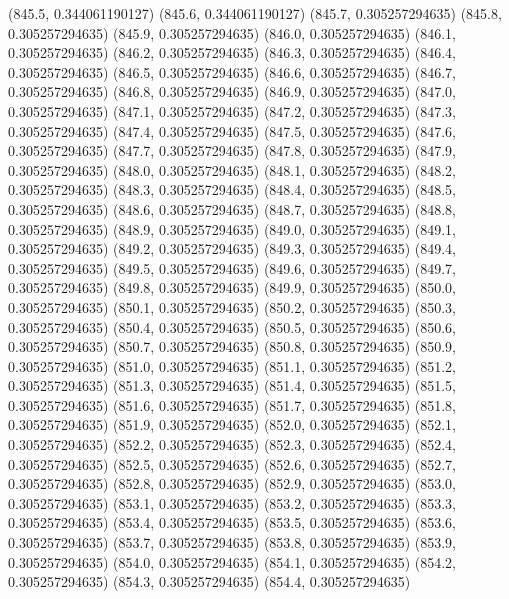 {					(845.5, 0.344061190127)
					(845.6, 0.344061190127)
					(845.7, 0.305257294635)
					(845.8, 0.305257294635)
					(845.9, 0.305257294635)
					(846.0, 0.305257294635)
					(846.1, 0.305257294635)
					(846.2, 0.305257294635)
					(846.3, 0.305257294635)
					(846.4, 0.305257294635)
					(846.5, 0.305257294635)
					(846.6, 0.305257294635)
					(846.7, 0.305257294635)
					(846.8, 0.305257294635)
					(846.9, 0.305257294635)
					(847.0, 0.305257294635)
					(847.1, 0.305257294635)
					(847.2, 0.305257294635)
					(847.3, 0.305257294635)
					(847.4, 0.305257294635)
					(847.5, 0.305257294635)
					(847.6, 0.305257294635)
					(847.7, 0.305257294635)
					(847.8, 0.305257294635)
					(847.9, 0.305257294635)
					(848.0, 0.305257294635)
					(848.1, 0.305257294635)
					(848.2, 0.305257294635)
					(848.3, 0.305257294635)
					(848.4, 0.305257294635)
					(848.5, 0.305257294635)
					(848.6, 0.305257294635)
					(848.7, 0.305257294635)
					(848.8, 0.305257294635)
					(848.9, 0.305257294635)
					(849.0, 0.305257294635)
					(849.1, 0.305257294635)
					(849.2, 0.305257294635)
					(849.3, 0.305257294635)
					(849.4, 0.305257294635)
					(849.5, 0.305257294635)
					(849.6, 0.305257294635)
					(849.7, 0.305257294635)
					(849.8, 0.305257294635)
					(849.9, 0.305257294635)
					(850.0, 0.305257294635)
					(850.1, 0.305257294635)
					(850.2, 0.305257294635)
					(850.3, 0.305257294635)
					(850.4, 0.305257294635)
					(850.5, 0.305257294635)
					(850.6, 0.305257294635)
					(850.7, 0.305257294635)
					(850.8, 0.305257294635)
					(850.9, 0.305257294635)
					(851.0, 0.305257294635)
					(851.1, 0.305257294635)
					(851.2, 0.305257294635)
					(851.3, 0.305257294635)
					(851.4, 0.305257294635)
					(851.5, 0.305257294635)
					(851.6, 0.305257294635)
					(851.7, 0.305257294635)
					(851.8, 0.305257294635)
					(851.9, 0.305257294635)
					(852.0, 0.305257294635)
					(852.1, 0.305257294635)
					(852.2, 0.305257294635)
					(852.3, 0.305257294635)
					(852.4, 0.305257294635)
					(852.5, 0.305257294635)
					(852.6, 0.305257294635)
					(852.7, 0.305257294635)
					(852.8, 0.305257294635)
					(852.9, 0.305257294635)
					(853.0, 0.305257294635)
					(853.1, 0.305257294635)
					(853.2, 0.305257294635)
					(853.3, 0.305257294635)
					(853.4, 0.305257294635)
					(853.5, 0.305257294635)
					(853.6, 0.305257294635)
					(853.7, 0.305257294635)
					(853.8, 0.305257294635)
					(853.9, 0.305257294635)
					(854.0, 0.305257294635)
					(854.1, 0.305257294635)
					(854.2, 0.305257294635)
					(854.3, 0.305257294635)
					(854.4, 0.305257294635)
}
